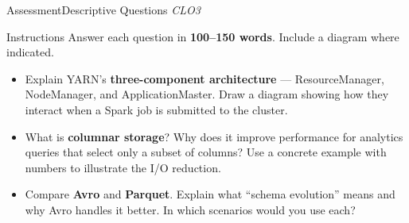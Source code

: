 \documentclass[aspectratio=169,10pt]{beamer}
\begin{document}
\begin{frame}{Assessment\textemdash Descriptive Questions \hfill\small\textit{CLO3}}
  \begin{block}{Instructions}
    Answer each question in \textbf{100--150 words}.  Include a diagram where indicated.
  \end{block}
  \vspace{8pt}
  \begin{itemize}
    \item[\textbf{D1.}] Explain YARN's \textbf{three-component architecture} — ResourceManager, NodeManager, and ApplicationMaster.  Draw a diagram showing how they interact when a Spark job is submitted to the cluster.
  \end{itemize}
  \vspace{8pt}
  \begin{itemize}
    \item[\textbf{D2.}] What is \textbf{columnar storage}?  Why does it improve performance for analytics queries that select only a subset of columns?  Use a concrete example with numbers to illustrate the I/O reduction.
  \end{itemize}
  \vspace{8pt}
  \begin{itemize}
    \item[\textbf{D3.}] Compare \textbf{Avro} and \textbf{Parquet}.  Explain what ``schema evolution'' means and why Avro handles it better.  In which scenarios would you use each?
  \end{itemize}
\end{frame}
\end{document}
